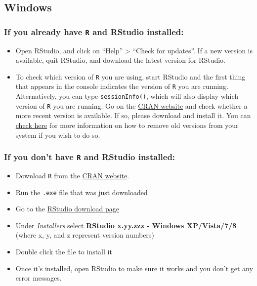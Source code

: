 \documentclass[
  12pt, krantz2,
]{krantz}
\newcommand{\passthrough}[1]{#1}
\providecommand{\tightlist}{%
  \setlength{\itemsep}{0pt}\setlength{\parskip}{0pt}}
\newcommand{\1}{\mathbbm{1}}
\theoremstyle{definition}
\theoremstyle{definition}
\theoremstyle{definition}
\theoremstyle{definition}
\theoremstyle{remark}
\begin{document}
\hypertarget{windows}{%
\subsection{Windows}\label{windows}}

\hypertarget{if-you-already-have-r-and-rstudio-installed}{%
\subsubsection*{\texorpdfstring{If you already have \texttt{R} and RStudio installed:}{If you already have R and RStudio installed:}}\label{if-you-already-have-r-and-rstudio-installed}}


\begin{itemize}
\tightlist
\item
  Open RStudio, and click on ``Help'' \textgreater{} ``Check for updates''. If a new version is
  available, quit RStudio, and download the latest version for RStudio.
\item
  To check which version of \passthrough{\lstinline!R!} you are using, start RStudio and the first thing
  that appears in the console indicates the version of \passthrough{\lstinline!R!} you are
  running. Alternatively, you can type \passthrough{\lstinline!sessionInfo()!}, which will also display
  which version of \passthrough{\lstinline!R!} you are running. Go on the \href{https://cran.r-project.org/bin/windows/base/}{CRAN
  website} and check whether a
  more recent version is available. If so, please download and install it. You
  can \href{https://cran.r-project.org/bin/windows/base/rw-FAQ.html\#How-do-I-UNinstall-R_003f}{check here}
  for more information on how to remove old versions from your system if you
  wish to do so.
\end{itemize}

\hypertarget{if-you-dont-have-r-and-rstudio-installed}{%
\subsubsection*{\texorpdfstring{If you don't have \texttt{R} and RStudio installed:}{If you don't have R and RStudio installed:}}\label{if-you-dont-have-r-and-rstudio-installed}}


\begin{itemize}
\tightlist
\item
  Download \passthrough{\lstinline!R!} from
  the \href{http://cran.r-project.org/bin/windows/base/release.htm}{CRAN website}.
\item
  Run the \passthrough{\lstinline!.exe!} file that was just downloaded
\item
  Go to the \href{https://www.rstudio.com/products/rstudio/download/\#download}{RStudio download page}
\item
  Under \emph{Installers} select \textbf{RStudio x.yy.zzz - Windows
  XP/Vista/7/8} (where x, y, and z represent version numbers)
\item
  Double click the file to install it
\item
  Once it's installed, open RStudio to make sure it works and you don't get any
  error messages.
\end{itemize}
\end{document}
